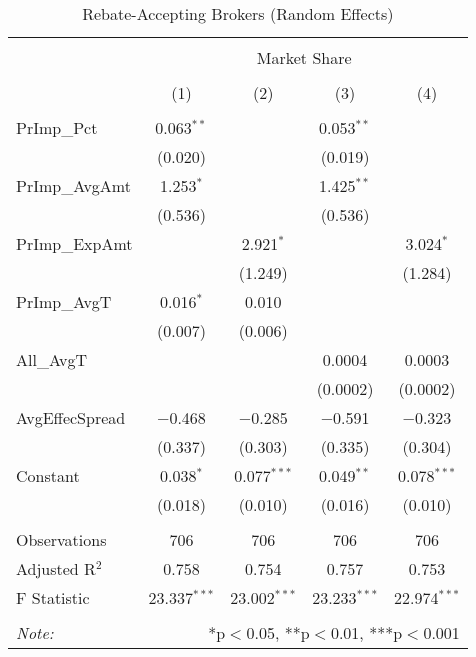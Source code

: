 \documentclass[11pt]{beamer}
\begin{document}
\begin{frame}
\fontsize{6pt}{7}\selectfont

\begin{table}[!htbp] \centering 
	\caption{Rebate-Accepting Brokers (Random Effects)} 
	\label{} 
	\begin{tabular}{@{\extracolsep{1em}}lcccc} 
		\\[-1.8ex]\hline 
		\hline \\[-1.8ex] 
		& \multicolumn{4}{c}{Market Share} \\ 
		\cline{2-5} 
		\\[-1.8ex] & (1) & (2) & (3) & (4)\\ 
		\hline \\[-1.8ex] 
		PrImp\_Pct & 0.063$^{**}$ &  & 0.053$^{**}$ &  \\ 
		& (0.020) &  & (0.019) &  \\ 
		PrImp\_AvgAmt & 1.253$^{*}$ &  & 1.425$^{**}$ &  \\ 
		& (0.536) &  & (0.536) &  \\ 
		PrImp\_ExpAmt &  & 2.921$^{*}$ &  & 3.024$^{*}$ \\ 
		&  & (1.249) &  & (1.284) \\ 
		PrImp\_AvgT & 0.016$^{*}$ & 0.010 &  &  \\ 
		& (0.007) & (0.006) &  &  \\ 
		All\_AvgT &  &  & 0.0004 & 0.0003 \\ 
		&  &  & (0.0002) & (0.0002) \\ 
		AvgEffecSpread & $-$0.468 & $-$0.285 & $-$0.591 & $-$0.323 \\ 
		& (0.337) & (0.303) & (0.335) & (0.304) \\ 
		Constant & 0.038$^{*}$ & 0.077$^{***}$ & 0.049$^{**}$ & 0.078$^{***}$ \\ 
		& (0.018) & (0.010) & (0.016) & (0.010) \\ 
		\hline \\[-1.8ex] 
		Observations & 706 & 706 & 706 & 706 \\ 
		Adjusted R$^{2}$ & 0.758 & 0.754 & 0.757 & 0.753 \\ 
		F Statistic & 23.337$^{***}$ & 23.002$^{***}$ & 23.233$^{***}$ & 22.974$^{***}$ \\ 
		\hline 
		\hline \\[-1.8ex] 
		\textit{Note:}  & \multicolumn{4}{r}{*p$<$0.05, **p$<$0.01, ***p$<$0.001} \\ 
	\end{tabular} 
\end{table} 

\end{frame}
\end{document}
